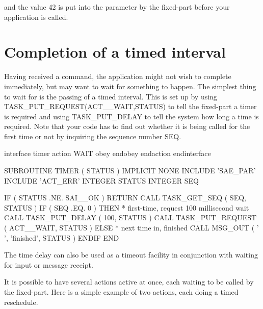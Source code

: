 \documentclass[twoside,11pt,nolof]{starlink}
\begin{document}
and the value 42 is put into the parameter by the fixed-part before your
application is called.

\section{Completion of a timed interval}

Having received a command, the application might not wish to complete
immediately, but may want to wait for something to happen. The simplest
thing to wait for is the passing of a timed interval. This is set up by
using TASK\_PUT\_REQUEST(ACT\_\_WAIT,STATUS) to tell the fixed-part a
timer is required and using TASK\_PUT\_DELAY to tell the system how long
a time is required. Note that your code has to find out whether it is
being called for the first time or not by inquiring the sequence number
SEQ.

\begin{small}
\begin{terminalv}
interface timer
   action WAIT
      obey
      endobey
   endaction
endinterface

      SUBROUTINE TIMER ( STATUS )
      IMPLICIT NONE
      INCLUDE 'SAE_PAR'
      INCLUDE 'ACT_ERR'
      INTEGER STATUS
      INTEGER SEQ

      IF ( STATUS .NE. SAI__OK ) RETURN
      CALL TASK_GET_SEQ ( SEQ, STATUS )
      IF ( SEQ .EQ. 0 ) THEN
*      first-time, request 100 millisecond wait
         CALL TASK_PUT_DELAY ( 100, STATUS )
         CALL TASK_PUT_REQUEST ( ACT__WAIT, STATUS )
      ELSE
*      next time in, finished
         CALL MSG_OUT ( ' ', 'finished', STATUS )
      ENDIF
      END
\end{terminalv}
\end{small}

The time delay can also be used as a timeout facility in conjunction
with waiting for input or message receipt.

It is possible to have several actions active at once, each waiting to
be called by the fixed-part. Here is a simple example of two actions,
each doing a timed reschedule.
\end{document}
